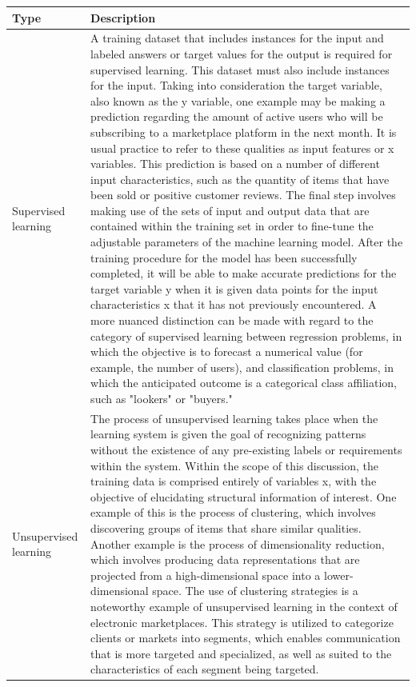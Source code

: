 \begin{longtable}{| p{} | p{} |}
    \hline
    \textbf{Type} & \textbf{Description} \\
    \hline
    Supervised learning &  A training dataset that includes instances for the input and labeled answers or target values for the output is required for supervised learning. This dataset must also include instances for the input. Taking into consideration the target variable, also known as the y variable, one example may be making a prediction regarding the amount of active users who will be subscribing to a marketplace platform in the next month. It is usual practice to refer to these qualities as input features or x variables. This prediction is based on a number of different input characteristics, such as the quantity of items that have been sold or positive customer reviews. The final step involves making use of the sets of input and output data that are contained within the training set in order to fine-tune the adjustable parameters of the machine learning model. After the training procedure for the model has been successfully completed, it will be able to make accurate predictions for the target variable y when it is given data points for the input characteristics x that it has not previously encountered. A more nuanced distinction can be made with regard to the category of supervised learning between regression problems, in which the objective is to forecast a numerical value (for example, the number of users), and classification problems, in which the anticipated outcome is a categorical class affiliation, such as "lookers" or "buyers." \\
    \hline
    Unsupervised learning & The process of unsupervised learning takes place when the learning system is given the goal of recognizing patterns without the existence of any pre-existing labels or requirements within the system. Within the scope of this discussion, the training data is comprised entirely of variables x, with the objective of elucidating structural information of interest. One example of this is the process of clustering, which involves discovering groups of items that share similar qualities. Another example is the process of dimensionality reduction, which involves producing data representations that are projected from a high-dimensional space into a lower-dimensional space. The use of clustering strategies is a noteworthy example of unsupervised learning in the context of electronic marketplaces. This strategy is utilized to categorize clients or markets into segments, which enables communication that is more targeted and specialized, as well as suited to the characteristics of each segment being targeted. \\

\end{longtable}
